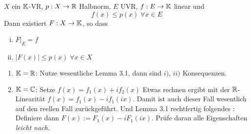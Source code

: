 \documentclass[ngerman]{report}
\begin{document}
	\begin{thm}
		$X$ ein $\mathbb{K}$-VR, $p: X \to \mathbb{R}$ Halbnorm, $E$ UVR, $f: E \to \mathbb{K}$ linear und
			$$ f(x) \leq p(x) \; \forall x \in E$$
	Dann existiert $F: X \to \mathbb{K}$, so dass 
		\begin{enumerate}[(i)]
			\item $F|_E = f$
			\item $|F(x)| \leq p(x) \; \forall x \in X$
		\end{enumerate}
	\end{thm}

	\begin{hinweise}
		\begin{enumerate}[{Fall} 1]
			\item $\mathbb{K} = \mathbb{R}$: Nutze wesentliche Lemma 3.1, dann sind $i)$, $ii)$ Konsequenzen.
			\item $\mathbb{K} = \mathbb{C}$: Setze $f(x) = f_1(x) + i f_2(x)$ Etwas rechnen ergibt mit der $\mathbb{R}$-Linearität 
				$f(x) = f_1(x) - i f_1(ix)$. Damit ist auch dieser Fall wesentlich auf den reellen Fall zurückgeführt. Und Lemma 3.1 rechtfertig folgendes :
				Definiere dann $F(x) := F_1(x) - i F_1(ix)$. Prüfe daran alle Eigenschaften \textit{leicht nach}.
		\end{enumerate}
	\end{hinweise}
\end{document}
